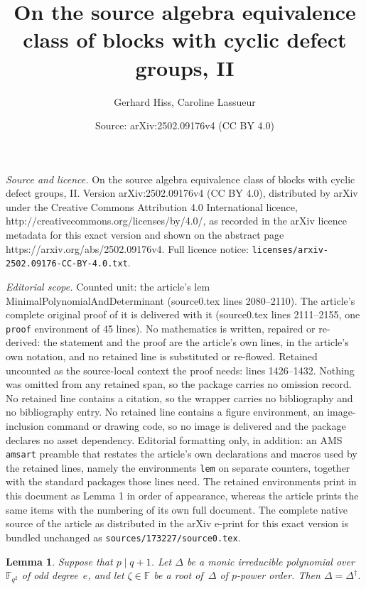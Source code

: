 \documentclass[10pt,a4paper]{amsart}
\title{On the source algebra equivalence class of blocks with cyclic defect groups, II}
\author{Gerhard Hiss, Caroline Lassueur}
\date{Source: arXiv:2502.09176v4 (CC BY 4.0)}
\newtheorem{lem}{Lemma}
\begin{document}
\maketitle

\noindent\emph{Source and licence.} On the source algebra equivalence class of blocks with cyclic defect groups, II. Version arXiv:2502.09176v4 (CC BY 4.0), distributed by arXiv under the Creative Commons Attribution 4.0 International licence, http://creativecommons.org/licenses/by/4.0/, as recorded in the arXiv licence metadata for this exact version and shown on the abstract page https://arxiv.org/abs/2502.09176v4. Full licence notice: \texttt{licenses/arxiv-2502.09176-CC-BY-4.0.txt}.\par\smallskip

\noindent\textit{Editorial scope.} Counted unit: the article's lem MinimalPolynomialAndDeterminant (source0.tex lines 2080--2110). The article's complete original proof of it is delivered with it (source0.tex lines 2111--2155, one \texttt{proof} environment of 45 lines). No mathematics is written, repaired or re-derived: the statement and the proof are the article's own lines, in the article's own notation, and no retained line is substituted or re-flowed.  Retained uncounted as the source-local context the proof needs: lines 1426--1432.  Nothing was omitted from any retained span, so the package carries no omission record.  No retained line contains a citation, so the wrapper carries no bibliography and no bibliography entry.  No retained line contains a figure environment, an image-inclusion command or drawing code, so no image is delivered and the package declares no asset dependency.  Editorial formatting only, in addition: an AMS \texttt{amsart} preamble that restates the article's own declarations and macros used by the retained lines, namely the environments \texttt{lem} on separate counters, together with the standard packages those lines need.  The retained environments print in this document as Lemma 1 in order of appearance, whereas the article prints the same items with the numbering of its own full document.  The complete native source of the article as distributed in the arXiv e-print for this exact version is bundled unchanged as \texttt{sources/173227/source0.tex}.
\begin{lem}
\label{UnitaryDelta}
Suppose that $p \mid q + 1$. 
Let $\Delta$ be a monic irreducible polynomial over~$\mathbb{F}_{q^2}$ of odd 
degree~$e$, and let $\zeta \in \mathbb{F}$ be a root of~$\Delta$ of $p$-power 
order. Then $\Delta = \Delta^{\dagger}$.
\end{lem}
\end{document}
